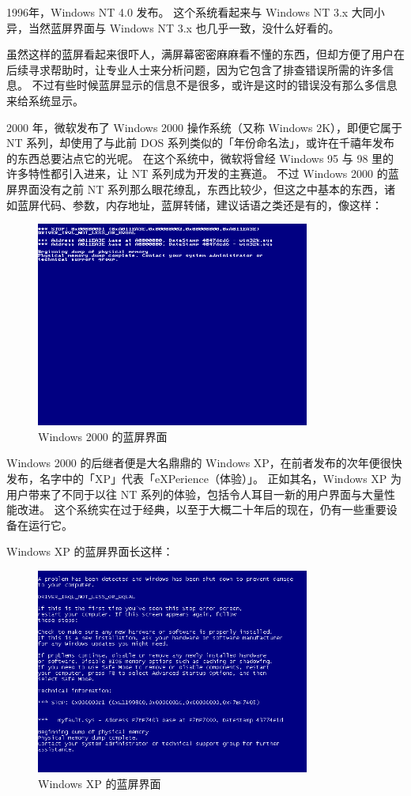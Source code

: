 1996年，Windows NT 4.0 发布。
这个系统看起来与 Windows NT 3.x 大同小异，当然蓝屏界面与 Windows NT 3.x 也几乎一致，没什么好看的。

虽然这样的蓝屏看起来很吓人，满屏幕密密麻麻看不懂的东西，但却方便了用户在后续寻求帮助时，让专业人士来分析问题，因为它包含了排查错误所需的许多信息。
不过有些时候蓝屏显示的信息不是很多，或许是这时的错误没有那么多信息来给系统显示。

2000 年，微软发布了 Windows 2000 操作系统（又称 Windows 2K），即便它属于 NT 系列，却使用了与此前 DOS 系列类似的「年份命名法」，或许在千禧年发布的东西总要沾点它的光呢。
在这个系统中，微软将曾经 Windows 95 与 98 里的许多特性都引入进来，让 NT 系列成为开发的主赛道。
不过 Windows 2000 的蓝屏界面没有之前 NT 系列那么眼花缭乱，东西比较少，但这之中基本的东西，诸如蓝屏代码、参数，内存地址，蓝屏转储，建议话语之类还是有的，像这样：

\begin{figure}[htb!]
  \centering
  \includegraphics[width=9cm]{assets/Win-2K-BSoD.png}
  \caption{Windows 2000 的蓝屏界面}
  \label{Win-2K-BSoD}
\end{figure}

Windows 2000 的后继者便是大名鼎鼎的 Windows XP，在前者发布的次年便很快发布，名字中的「XP」代表「eXPerience（体验）」。
正如其名，Windows XP 为用户带来了不同于以往 NT 系列的体验，包括令人耳目一新的用户界面与大量性能改进。
这个系统实在过于经典，以至于大概二十年后的现在，仍有一些重要设备在运行它。

Windows XP 的蓝屏界面长这样：

\begin{figure}[htb!]
  \centering
  \includegraphics[width=9cm]{assets/Win-XP-BSoD.png}
  \caption{Windows XP 的蓝屏界面}
  \label{Win-XP-BSoD}
\end{figure}

